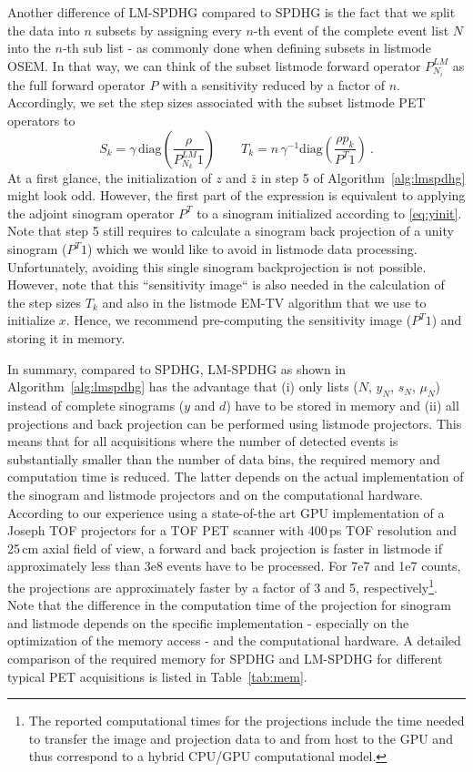 Another difference of LM-SPDHG compared to SPDHG is the fact that we split the data into $n$ subsets by
assigning every $n$-th event of the complete event list $N$ into the $n$-th sub list - 
as commonly done when defining subsets in listmode OSEM.
In that way, we can think of the subset listmode forward operator $P^{LM}_{N_i}$
as the full forward operator $P$ with a sensitivity reduced by a factor of $n$.
Accordingly, we set the step sizes associated with the subset listmode PET operators to
%
\begin{equation}
S_k = \gamma \, \text{diag}(\frac{\rho}{P^{LM}_{N_k} 1} )\qquad  T_k = n\,\gamma^{-1} \text{diag}(\frac{\rho p_k}{P^T 1}) \ . 
\label{eq:lm_stepsizes}
\end{equation}
% 
At a first glance, the initialization of $z$ and $\bar{z}$ in step 5 of Algorithm~\ref{alg:lmspdhg} 
might look odd.
However, the first part of the expression is equivalent to 
applying the adjoint sinogram operator $P^T$ to a sinogram initialized according to \eqref{eq:yinit}.
Note that step 5 still requires to calculate a sinogram back projection of a unity sinogram ($P^T 1$)
which we would like to avoid in listmode data processing.
Unfortunately, avoiding this single sinogram backprojection is not possible.
However, note that this ``sensitivity image`` is also needed in the calculation of the step sizes
$T_k$ and also in the listmode EM-TV algorithm that we use to initialize $x$.
Hence, we recommend pre-computing the sensitivity image ($P^T 1$) and storing it in memory.

In summary, compared to SPDHG, LM-SPDHG as shown in Algorithm~\ref{alg:lmspdhg} has the advantage
that (i) only lists ($N$, $y_{N}$, $s_N$, $\mu_N$) instead of complete sinograms 
($y$ and $d$) have to be 
stored in memory and (ii) all projections and back projection can be performed using listmode
projectors.
This means that for all acquisitions where the number of detected events is substantially smaller than
the number of data bins, the required memory and computation time is reduced.
The latter depends on the actual implementation of the sinogram and listmode projectors
and on the computational hardware.
According to our experience using a state-of-the art GPU implementation of a Joseph TOF projectors
for a TOF PET scanner with 400\,ps TOF resolution and 25\,cm axial field of view,
a forward and back projection is faster in listmode if approximately less than 3e8 events 
have to be processed.
For 7e7 and 1e7 counts, the projections are approximately faster by a factor of 3 and 5,
respectively\footnote{The reported computational times for the projections include the time
needed to transfer the image and projection data to and from host to the GPU and thus
correspond to a hybrid CPU/GPU computational model.}.
Note that the difference in the computation time of the projection for sinogram and listmode 
depends on the specific implementation - especially on the optimization of the memory access - 
and the computational hardware.
A detailed comparison of the required memory for SPDHG and LM-SPDHG for different typical PET
acquisitions is listed in Table~\ref{tab:mem}.

